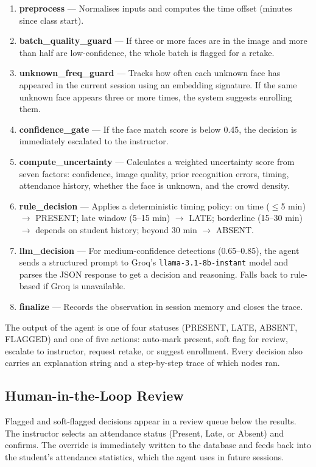 \documentclass[conference]{IEEEtran}
\begin{document}
\begin{enumerate}
  \item \textbf{preprocess} --- Normalises inputs and computes the time offset (minutes since class start).
  \item \textbf{batch\_quality\_guard} --- If three or more faces are in the image and more than half are low-confidence, the whole batch is flagged for a retake.
  \item \textbf{unknown\_freq\_guard} --- Tracks how often each unknown face has appeared in the current session using an embedding signature. If the same unknown face appears three or more times, the system suggests enrolling them.
  \item \textbf{confidence\_gate} --- If the face match score is below 0.45, the decision is immediately escalated to the instructor.
  \item \textbf{compute\_uncertainty} --- Calculates a weighted uncertainty score from seven factors: confidence, image quality, prior recognition errors, timing, attendance history, whether the face is unknown, and the crowd density.
  \item \textbf{rule\_decision} --- Applies a deterministic timing policy: on time ($\leq$5 min) $\to$ PRESENT; late window (5--15 min) $\to$ LATE; borderline (15--30 min) $\to$ depends on student history; beyond 30 min $\to$ ABSENT.
  \item \textbf{llm\_decision} --- For medium-confidence detections (0.65--0.85), the agent sends a structured prompt to Groq's \texttt{llama-3.1-8b-instant} model and parses the JSON response to get a decision and reasoning. Falls back to rule-based if Groq is unavailable.
  \item \textbf{finalize} --- Records the observation in session memory and closes the trace.
\end{enumerate}

The output of the agent is one of four statuses (PRESENT, LATE, ABSENT, FLAGGED) and one of five actions: auto-mark present, soft flag for review, escalate to instructor, request retake, or suggest enrollment. Every decision also carries an explanation string and a step-by-step trace of which nodes ran.

\subsection{Human-in-the-Loop Review}

Flagged and soft-flagged decisions appear in a review queue below the results. The instructor selects an attendance status (Present, Late, or Absent) and confirms. The override is immediately written to the database and feeds back into the student's attendance statistics, which the agent uses in future sessions.
\end{document}
